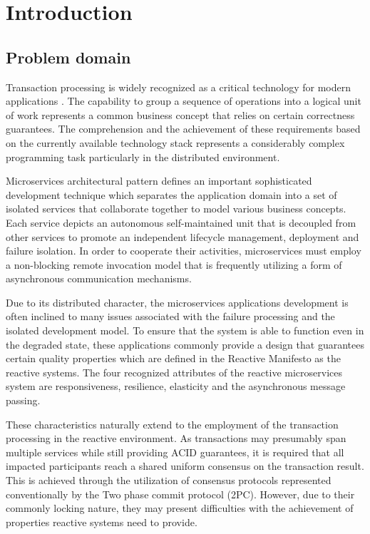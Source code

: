 \documentclass[oneside,
  digital, %
  table,   %
  nolof,     %
  nolot,     %
]{fithesis3}
\begin{document}
\chapter{Introduction}

\section{Problem domain}

Transaction processing is widely recognized as a critical technology for modern applications \cite{java_tran_processing}. The capability to group a sequence of operations into a logical unit of work represents a common business concept that relies on certain correctness guarantees. The comprehension and the achievement of these requirements based on the currently available technology stack represents a considerably complex programming task particularly in the distributed environment.

Microservices architectural pattern defines an important sophisticated development technique which separates the application domain into a set of isolated services that collaborate together to model various business concepts. Each service depicts an autonomous self-maintained unit that is decoupled from other services to promote an independent lifecycle management, deployment and failure isolation. In order to cooperate their activities, microservices must employ a non-blocking remote invocation model that is frequently utilizing a form of asynchronous communication mechanisms.

Due to its distributed character, the microservices applications development is often inclined to many issues associated with the failure processing and the isolated development model. To ensure that the system is able to function even in the degraded state, these applications commonly provide a design that guarantees certain quality properties which are defined in the Reactive Manifesto \cite{reactive_manifesto} as the reactive systems. The four recognized attributes of the reactive microservices system are responsiveness, resilience, elasticity and the asynchronous message passing.

These characteristics naturally extend to the employment of the transaction processing in the reactive environment. As transactions may presumably span multiple services while still providing ACID guarantees, it is required that all impacted participants reach a shared uniform consensus on the transaction result. This is achieved through the utilization of consensus protocols represented conventionally by the Two phase commit protocol (2PC). However, due to their commonly locking nature, they may present difficulties with the achievement of properties reactive systems need to provide.
\end{document}
